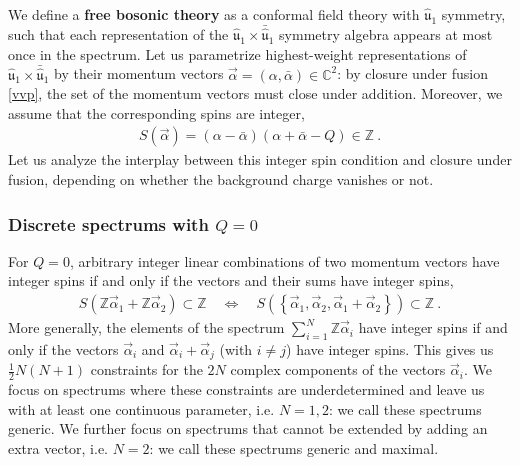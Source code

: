 \documentclass[12pt, a4paper, notitlepage, twoside]{report}
\numberwithin{equation}{section}
\theoremstyle{break}
\begin{document}
We define a \textbf{\boldmath free bosonic theory} as a conformal field theory with $\hat{\mathfrak{u}}_1$ symmetry, such that each representation of the $\hat{\mathfrak{u}}_1 \times \bar{\hat{\mathfrak{u}}}_1$ symmetry algebra appears at most once in the spectrum. Let us parametrize highest-weight representations of $\hat{\mathfrak{u}}_1 \times \bar{\hat{\mathfrak{u}}}_1$ by their momentum vectors $\vec\alpha = (\alpha,\bar\alpha)\in\mathbb{C}^2$: by closure under fusion \eqref{vvp}, the set of the momentum vectors must close under addition. Moreover, we assume that the corresponding spins are integer,
\begin{align}
 S(\vec\alpha) = (\alpha-\bar\alpha)(\alpha+\bar\alpha-Q)\in\mathbb{Z}\ . 
\end{align}
Let us analyze the interplay between this integer spin condition and closure under fusion, depending on whether the background charge vanishes or not.

\subsubsection{Discrete spectrums with $Q=0$}

For $Q=0$, arbitrary integer linear combinations of two momentum vectors have integer spins if and only if the vectors and their sums have integer spins,
\begin{align}
 S\left(\mathbb{Z}\vec\alpha_1 + \mathbb{Z}\vec\alpha_2\right)\subset \mathbb{Z} \quad \iff \quad S\left(\left\{\vec\alpha_1,\vec\alpha_2,\vec\alpha_1+\vec\alpha_2\right\}\right)\subset \mathbb{Z}\ .
\end{align}
More generally, the elements of the spectrum $\sum_{i=1}^N \mathbb{Z}\vec \alpha_i$ have integer spins if and only if the vectors $\vec\alpha_i$ and $\vec\alpha_i+\vec\alpha_j$ (with $i\neq j$) have integer spins. This gives us $\frac12 N(N+1)$ constraints for the $2N$ complex components of the vectors $\vec\alpha_i$. We focus on spectrums where these constraints are underdetermined and leave us with at least one continuous parameter, i.e. $N=1,2$: we call these spectrums generic. We further focus on spectrums that cannot be extended by adding an extra vector, i.e. $N=2$: we call these spectrums generic and maximal.
\end{document}
